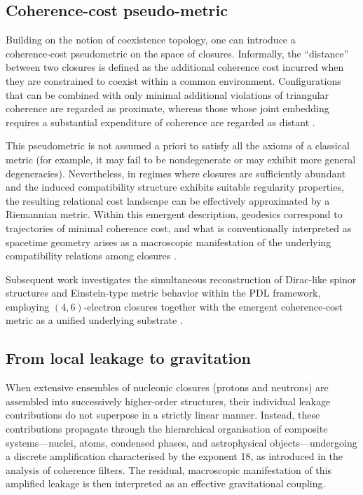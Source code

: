 \documentclass{article}
\begin{document}
\subsection{Coherence-cost pseudo-metric}
\label{subsec:coherence_metric}

Building on the notion of coexistence topology, one can introduce a coherence‑cost pseudometric on the space of closures. Informally, the “distance” between two closures is defined as the additional coherence cost incurred when they are constrained to coexist within a common environment. Configurations that can be combined with only minimal additional violations of triangular coherence are regarded as proximate, whereas those whose joint embedding requires a substantial expenditure of coherence are regarded as distant \citep{Coherence_Leakage_18_2026}.

This pseudometric is not assumed a priori to satisfy all the axioms of a classical metric (for example, it may fail to be nondegenerate or may exhibit more general degeneracies). Nevertheless, in regimes where closures are sufficiently abundant and the induced compatibility structure exhibits suitable regularity properties, the resulting relational cost landscape can be effectively approximated by a Riemannian metric. Within this emergent description, geodesics correspond to trajectories of minimal coherence cost, and what is conventionally interpreted as spacetime geometry arises as a macroscopic manifestation of the underlying compatibility relations among closures \citep{PDL_Main_2026,PDL_position}. 

Subsequent work investigates the simultaneous reconstruction of Dirac-like spinor structures and Einstein-type metric behavior within the PDL framework, employing \((4,6)\)-electron closures together with the emergent coherence‑cost metric as a unified underlying substrate \citep{Einstein_Dirac_PDL_2026}.

\subsection{From local leakage to gravitation}
\label{subsec:leakage_gravity}

When extensive ensembles of nucleonic closures (protons and neutrons) are assembled into successively higher-order structures, their individual leakage contributions do not superpose in a strictly linear manner. Instead, these contributions propagate through the hierarchical organisation of composite systems—nuclei, atoms, condensed phases, and astrophysical objects—undergoing a discrete amplification characterised by the exponent 18, as introduced in the analysis of coherence filters. The residual, macroscopic manifestation of this amplified leakage is then interpreted as an effective gravitational coupling.\citep{Exponent_18_PDL_2026,PDL_Main_2026}
\end{document}
